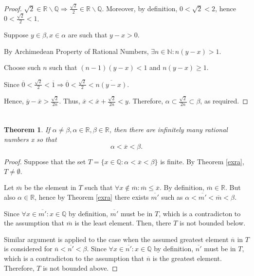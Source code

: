 \documentclass[12pt]{article}
\def\Re{\mathbb{R}}
\def\Q{\mathbb{Q}}
\def\arc{Archimedean Property of Rational Numbers}
\def\ra{\Rightarrow}
\def\v{\\ \vspace{0.1in}}
\def\x{\overline{x}}
\def\ss{\subset}
\def\N{\mathbb{N}}
\def\ir{\Re\backslash\Q}
\def\rt{\frac{\sqrt{2}}{2}}
\newtheorem{theorem}{Theorem}[section]
\theoremstyle{definition}
\theoremstyle{remark}
\begin{document}
\begin{proof}
  $\sqrt{2}\in\Re\backslash\Q \ra \frac{\sqrt{2}}{2} \in\ir
  $. Moreover, by definition, $0<\sqrt{2}<2$, hence $0<\rt < 1$.\v

  Suppose $y\in\beta,x\in\alpha$ are such that $y-x>0$.\v

  By \arc, $\exists n \in \N:n(y-x)>1$. \v

  Choose such $n$ such that $(n-1)(y-x)<1$ and $n(y-x)\geq1$.\v

  Since $\overline{0} < \rt < \overline{1} \ra \overline{0} < \rt < \overline{n(y-x)}$.\v

  Hence, $\overline{y}-\x>\frac{\sqrt{2}}{2n}$. Thus,
  $\overline{x}<\x+\frac{\sqrt{2}}{2n}<y$. Therefore,
  $\alpha \ss \frac{\sqrt{2}}{2n} \ss \beta$, as required.
\end{proof}
\section{}
\begin{theorem}

  If $\alpha\neq\beta, \alpha\in\Re, \beta\in\Re$, then there are
  infinitely many rational numbers x so that
  \begin{equation*}
    \alpha<\x<\beta.
  \end{equation*}
\end{theorem}
\begin{proof}
  Suppose that the set $T=\{x\in\Q:\alpha<\x<\beta\}$ is finite. By
  Theorem \ref{exra}, $T\neq\emptyset$.\v

  Let $\overline{m}$ be the element in $T$ such that
  $\forall x \not\in \overline{m}: \overline{m}\leq\x$. By definition,
  $\overline{m}\in\Re$. But also $\alpha \in \Re$, hence by Theorem
  \ref{exra} there exists $\overline{m'}$ such as
  $\alpha < \overline{m'} < \overline{m}<\beta$.\v

  Since $\forall x\in\overline{m'}:x\in\Q$ by definition,
  $\overline{m'}$ must be in $T$, which is a contradicton to the
  assumption that $\overline{m}$ is the least element. Then, there $T$ is
  not bounded below.\v

  Similar argument is applied to the case when the assumed greatest
  element $\overline{n}$ in $T$ is considered for
  $\overline{n}< \overline{n'} <\beta$. Since
  $\forall x\in\overline{n'}:x\in\Q$ by definition, $\overline{n'}$
  must be in $T$, which is a contradicton to the assumption that
  $\overline{n}$ is the greatest element. Therefore, $T$ is not bounded above.



\end{proof}
\end{document}
